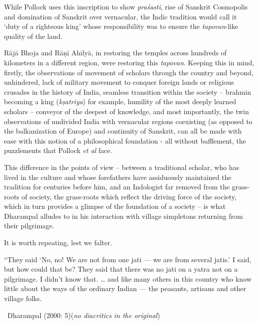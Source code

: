 \newpage

While Pollock uses this inscription to show \textit{praśasti}, rise of Sanskrit Cosmopolis and domination of Sanskrit over vernacular, the Indic tradition would call it ‘duty of a righteous king’ whose responsibility was to ensure the \textit{tapovan}-like quality of the land.

Rājā Bhoja and Rāṇī Ahilyā, in restoring the temples across hundreds of kilometers in a different region, were restoring this \textit{tapovan}. Keeping this in mind, firstly, the observations of movement of scholars through the country and beyond, unhindered, lack of military movement to conquer foreign lands or religious crusades in the history of India, seamless transition within the society – brahmin becoming a king (\textit{kṣatriya}) for example, humility of the most deeply learned scholars – conveyor of the deepest of knowledge, and most importantly, the twin observations of undivided India with vernacular regions coexisting (as opposed to the balkanization of Europe) and continuity of Sanskrit, can all be made with ease with this notion of a philosophical foundation - all without bafflement, the puzzlements that Pollock \textit{et al} face.

This difference in the points of view – between a traditional scholar, who has lived in the culture and whose forefathers have assiduously maintained the tradition for centuries before him, and an Indologist far removed from the grass-roots of society, the grass-roots which reflect the driving force of the society, which in turn provides a glimpse of the foundation of a society – is what Dharampal alludes to in his interaction with village simpletons returning from their pilgrimage.

It is worth repeating, lest we falter.

\begin{myquote}
“They said ‘No, no! We are not from one jati — we are from several jatis.’ I said, but how could that be? They said that there was no jati on a yatra not on a pilgrimage. I didn’t know that. … and like many others in this country who know little about the ways of the ordinary Indian — the peasants, artisans and other village folks. 

~\hfill Dharampal (2000: 5)(\textit{no diacritics in the original})
\end{myquote}


